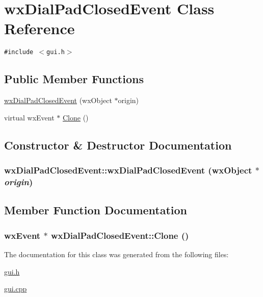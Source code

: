 \hypertarget{classwxDialPadClosedEvent}{
\section{wxDialPadClosedEvent Class Reference}
\label{classwxDialPadClosedEvent}
}
{\tt \#include $<$gui.h$>$}

\subsection*{Public Member Functions}
\begin{CompactItemize}
\item 
\hyperlink{classwxDialPadClosedEvent_2fc1dd8d8309caacf0c74771356d3743}{wxDialPadClosedEvent} (wxObject $\ast$origin)
\item 
virtual wxEvent $\ast$ \hyperlink{classwxDialPadClosedEvent_e4f9e1196ee65a651b572c285dcdd75e}{Clone} ()
\end{CompactItemize}


\subsection{Constructor \& Destructor Documentation}
\hypertarget{classwxDialPadClosedEvent_2fc1dd8d8309caacf0c74771356d3743}{
\subsubsection[{wxDialPadClosedEvent}]{\setlength{\rightskip}{0pt plus 5cm}wxDialPadClosedEvent::wxDialPadClosedEvent (wxObject $\ast$ {\em origin})}}
\label{classwxDialPadClosedEvent_2fc1dd8d8309caacf0c74771356d3743}




\subsection{Member Function Documentation}
\hypertarget{classwxDialPadClosedEvent_e4f9e1196ee65a651b572c285dcdd75e}{
\subsubsection[{Clone}]{\setlength{\rightskip}{0pt plus 5cm}wxEvent $\ast$ wxDialPadClosedEvent::Clone ()}}
\label{classwxDialPadClosedEvent_e4f9e1196ee65a651b572c285dcdd75e}




The documentation for this class was generated from the following files:\begin{CompactItemize}
\item 
\hyperlink{gui_8h}{gui.h}\item 
\hyperlink{gui_8cpp}{gui.cpp}\end{CompactItemize}
